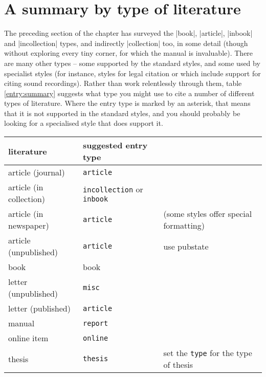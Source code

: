 \section{A summary by type of literature}

The preceding section of the chapter has surveyed the |book|,
|article|, |inbook| and |incollection| types, and indirectly
|collection| too, in some detail (though without exploring every tiny
corner, for which the manual is invaluable). There are many other
types -- some supported by the standard styles, and some used by
specialist styles (for instance, styles for legal citation or which
include support for citing sound recordings). Rather than work
relentlessly through them, table \ref{entry:summary} suggests what
type you might use to cite a number of different types of
literature. Where the entry type is marked by an asterisk, that means
that it is not supported in the standard styles, and you should
probably be looking for a specialised style that does support it.

\begin{table*}
\begin{tabularx}{\linewidth}{llX}
\toprule
\textsf{literature}     & \textsf{suggested entry type} &                                              \\
\midrule
article (journal)       & \texttt{article}                                                             \\
article (in collection) & \texttt{incollection} or \texttt{inbook}                                     \\
article (in newspaper)  & \texttt{article}              & (some styles offer special formatting)       \\
article (unpublished)   & \texttt{article}              & use pubstate                                 \\
book                    & book                                                                         \\
letter (unpublished)    & \texttt{misc}                                                                \\
letter (published)      & \texttt{article}                                                             \\
manual                  & \texttt{report}                                                              \\
online item             & \texttt{online}                                                              \\
thesis                  & \texttt{thesis}               & set the \texttt{type} for the type of thesis \\
\bottomrule
\end{tabularx}
\caption{Sources and entry types\label{entry:summary}}
\end{table*}


